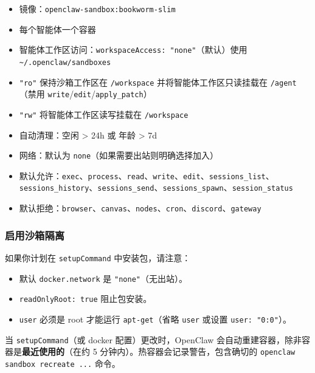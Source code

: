 \begin{itemize}
  \item 镜像：\texttt{openclaw-sandbox:bookworm-slim}
  \item 每个智能体一个容器
  \item 智能体工作区访问：\texttt{workspaceAccess: "none"}（默认）使用 \texttt{\textasciitilde{}/.openclaw/sandboxes}
  \item \texttt{"ro"} 保持沙箱工作区在 \texttt{/workspace} 并将智能体工作区只读挂载在 \texttt{/agent}（禁用 \texttt{write}/\texttt{edit}/\texttt{apply\_patch}）
  \item \texttt{"rw"} 将智能体工作区读写挂载在 \texttt{/workspace}
  \item 自动清理：空闲 > 24h 或 年龄 > 7d
  \item 网络：默认为 \texttt{none}（如果需要出站则明确选择加入）
  \item 默认允许：\texttt{exec}、\texttt{process}、\texttt{read}、\texttt{write}、\texttt{edit}、\texttt{sessions\_list}、\texttt{sessions\_history}、\texttt{sessions\_send}、\texttt{sessions\_spawn}、\texttt{session\_status}
  \item 默认拒绝：\texttt{browser}、\texttt{canvas}、\texttt{nodes}、\texttt{cron}、\texttt{discord}、\texttt{gateway}
\end{itemize}


\subsubsection{启用沙箱隔离}


如果你计划在 \texttt{setupCommand} 中安装包，请注意：

\begin{itemize}
  \item 默认 \texttt{docker.network} 是 \texttt{"none"}（无出站）。
  \item \texttt{readOnlyRoot: true} 阻止包安装。
  \item \texttt{user} 必须是 root 才能运行 \texttt{apt-get}（省略 \texttt{user} 或设置 \texttt{user: "0:0"}）。
\end{itemize}

当 \texttt{setupCommand}（或 docker 配置）更改时，OpenClaw 会自动重建容器，除非容器是\textbf{最近使用的}（在约 5 分钟内）。热容器会记录警告，包含确切的 \texttt{openclaw sandbox recreate ...} 命令。

